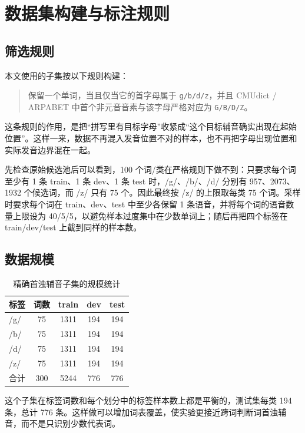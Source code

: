 \section{数据集构建与标注规则}

\subsection{筛选规则}

本文使用的子集按以下规则构建：
\begin{quote}
保留一个单词，当且仅当它的首字母属于 \texttt{g/b/d/z}，并且 CMUdict / ARPABET 中首个非元音音素与该字母严格对应为 \texttt{G/B/D/Z}。
\end{quote}

这条规则的作用，是把“拼写里有目标字母”收紧成“这个目标辅音确实出现在起始位置”。这样一来，数据不再混入发音位置不对的样本，也不再把字母出现位置和实际发音边界混在一起。

先检查原始候选池后可以看到，100 个词/类在严格规则下做不到：只要求每个词至少有 1 条 train、1 条 dev、1 条 test 时，/g/、/b/、/d/ 分别有 957、2073、1932 个候选词，而 /z/ 只有 75 个。因此最终按 /z/ 的上限取每类 75 个词。采样时要求每个词在 train、dev、test 中至少各保留 1 条语音，并将每个词的语音数量上限设为 40/5/5，以避免样本过度集中在少数单词上；随后再把四个标签在 train/dev/test 上截到同样的样本数。

\subsection{数据规模}

\begin{table}[H]
    \centering
    \caption{精确首浊辅音子集的规模统计}
    \label{tab:dataset}
    \begin{tabular}{lcccc}
        \toprule
        标签 & 词数 & train & dev & test \\
        \midrule
        /g/ & 75 & 1311 & 194 & 194 \\
        /b/ & 75 & 1311 & 194 & 194 \\
        /d/ & 75 & 1311 & 194 & 194 \\
        /z/ & 75 & 1311 & 194 & 194 \\
        \midrule
        合计 & 300 & 5244 & 776 & 776 \\
        \bottomrule
    \end{tabular}
\end{table}

这个子集在标签词数和每个划分中的标签样本数上都是平衡的，测试集每类 194 条，总计 776 条。这样做可以增加词表覆盖，使实验更接近跨词判断词首浊辅音，而不是只识别少数代表词。

